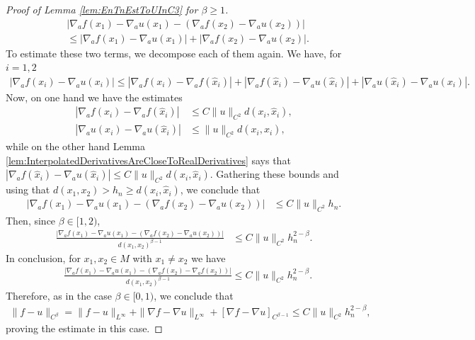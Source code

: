 \documentclass[11pt,reqno]{amsart}
\numberwithin{equation}{section}
\theoremstyle{plain}
\begin{document}
\begin{proof}[Proof of Lemma \ref{lem:EnTnEstToUInC3} for $\beta \geq 1$]
\begin{align*}
    & |\nabla_af(x_1)-\nabla_a u(x_1)-(\nabla_af(x_2)-\nabla_a u(x_2))|\\
    & \leq |\nabla_af(x_1)-\nabla_a u(x_1)| +|\nabla_af(x_2)-\nabla_a u(x_2)|.	  
  \end{align*}	  
  To estimate these two terms, we decompose each of them again. We have, for $i=1,2$
  \begin{align*}
    |\nabla_af(x_i)-\nabla_a u(x_i)| \leq |\nabla_af(x_i)-\nabla_af(\hat x_i)|+ |\nabla_a f(\hat x_i)-\nabla_a u(\hat x_i)|+|\nabla_a u(\hat x_i)-\nabla_a u(x_i)|.
  \end{align*}
  Now, on one hand we have the estimates
  \begin{align*}
    |\nabla_af(x_i)-\nabla_af(\hat x_i)| & \leq C\|u\|_{C^2}d(x_i,\hat x_i),\\
    |\nabla_au(x_i)-\nabla_au(\hat x_i)| & \leq \|u\|_{C^2}d(x_i,\hat x_i),
  \end{align*}
  while on the other hand Lemma \ref{lem:InterpolatedDerivativesAreCloseToRealDerivatives} says that $|\nabla_a f(\hat x_i)-\nabla_a u(\hat x_i)| \leq C\|u\|_{C^2}d(x_i,\hat x_i)$. Gathering these bounds and using that $d(x_1,x_2)>h_n \geq d(x_i,\hat x_i)$, we conclude that
  \begin{align*}
    |\nabla_af(x_1)-\nabla_a u(x_1)-(\nabla_af(x_2)-\nabla_a u(x_2))| & \leq C\|u\|_{C^2}h_n.
  \end{align*}  
  Then, since $\beta \in [1,2)$, 
  \begin{align*}
    \frac{|\nabla_af(x_1)-\nabla_a u(x_1)-(\nabla_af(x_2)-\nabla_a u(x_2))|}{d(x_1,x_2)^{\beta-1}} & \leq C\|u\|_{C^2}h_n^{2-\beta}.
  \end{align*}  
  In conclusion, for $x_1,x_2\in M$ with $x_1\neq x_2$ we have
  \begin{align*}
    & \frac{|\nabla_{a} f(x_1)-\nabla_{a}u(x_1)-(\nabla_{a}f(x_2)-\nabla_{a}f(x_2))|}{d(x_1,x_2)^{\beta-1}} \leq C\|u\|_{C^2}h_n^{2-\beta}.
  \end{align*}
  Therefore, as in the case $\beta \in [0,1)$, we conclude that
  \begin{align*}
    \|f-u\|_{C^\beta} = \|f-u\|_{L^\infty}+\|\nabla f-\nabla u\|_{L^\infty}+[\nabla f-\nabla u]_{C^{\beta-1}} \leq C\|u\|_{C^2}h_n^{2-\beta}, 	  
  \end{align*}	  
  proving the estimate in this case.
  

\end{proof}
\end{document}
